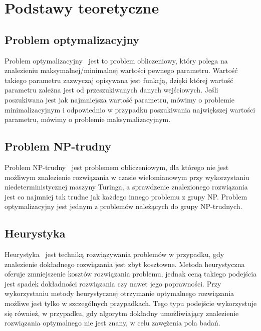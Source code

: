 

\chapter{Podstawy teoretyczne}
\section{Problem optymalizacyjny}
Problem optymalizacyjny~\cite{optimization_problem} jest to problem obliczeniowy, który polega na znalezieniu maksymalnej/minimalnej wartości pewnego parametru. Wartość takiego parametru zazwyczaj opisywana jest funkcją, dzięki której wartość parametru zależna jest od przeszukiwanych danych wejściowych. Jeśli poszukiwana jest jak najmniejsza wartość parametru, mówimy o problemie minimalizacyjnym i odpowiednio w przypadku poszukiwania największej wartości parametru, mówimy o problemie maksymalizacyjnym.

\section{Problem NP-trudny}
Problem NP-trudny~\cite{np_hard} jest problemem obliczeniowym, dla którego nie jest możliwym znalezienie rozwiązania w czasie wielomianowym przy wykorzystaniu niedeterministycznej maszyny Turinga, a sprawdzenie znalezionego rozwiązania jest co najmniej tak trudne jak każdego innego problemu z grupy NP. Problem optymalizacyjny jest jednym z problemów należących do grupy NP-trudnych.

\section{Heurystyka}
Heurystyka~\cite{heuristic} jest techniką rozwiązywania problemów w przypadku, gdy znalezienie dokładnego rozwiązania jest zbyt kosztowne. Metoda heurystyczna oferuje zmniejszenie kosztów rozwiązania problemu, jednak ceną takiego podejścia jest spadek dokładności rozwiązania czy nawet jego poprawności.  Przy wykorzystaniu metody heurystycznej otrzymanie optymalnego rozwiązania możliwe jest tylko w szczególnych przypadkach. Tego typu podejście wykorzystuje się również, w przypadku, gdy algorytm dokładny umożliwiający znalezienie rozwiązania optymalnego nie jest znany, w celu zawężenia pola badań.


